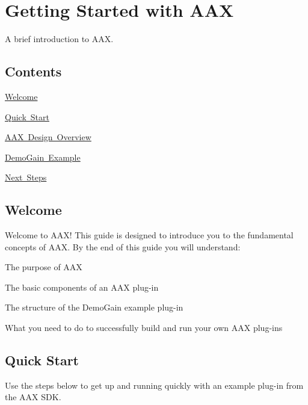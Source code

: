 \hypertarget{a00794}{}\section{Getting Started with A\+AX}
\label{a00794}
A brief introduction to A\+AX. 

\hypertarget{a00794_aax_getting_started_guide_contents}{}\subsection{Contents}\label{a00794_aax_getting_started_guide_contents}
\begin{DoxyItemize}
\item \mbox{\hyperlink{a00794_aax_sdk_guide_00_introduction}{Welcome}} \item \mbox{\hyperlink{a00794_aax_sdk_guide_quickstart}{Quick Start}} \item \mbox{\hyperlink{a00794_aax_sdk_guide_01_aax_design_overview}{A\+AX Design Overview}} \item \mbox{\hyperlink{a00794_aax_sdk_guide_02_demogain_example}{Demo\+Gain Example}} \item \mbox{\hyperlink{a00794_aax_sdk_guide_next_steps}{Next Steps}}\end{DoxyItemize}
 \hypertarget{a00794_aax_sdk_guide_00_introduction}{}\subsection{Welcome}\label{a00794_aax_sdk_guide_00_introduction}
 Welcome to A\+AX! This guide is designed to introduce you to the fundamental concepts of A\+AX. By the end of this guide you will understand\+: \begin{DoxyItemize}
\item The purpose of A\+AX \item The basic components of an A\+AX plug-\/in \item The structure of the Demo\+Gain example plug-\/in \item What you need to do to successfully build and run your own A\+AX plug-\/ins\end{DoxyItemize}


 \hypertarget{a00794_aax_sdk_guide_quickstart}{}\subsection{Quick Start}\label{a00794_aax_sdk_guide_quickstart}
 Use the steps below to get up and running quickly with an example plug-\/in from the A\+AX S\+DK.

